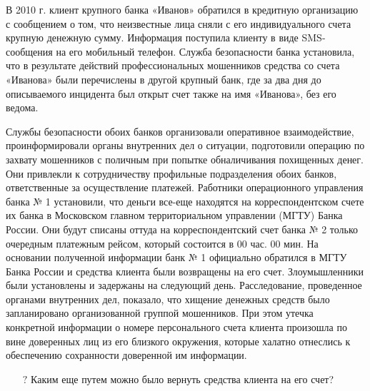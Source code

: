 \documentclass[a4paper,12pt,fleqn]{article} %
\begin{document}
\begin{tcolorbox}[colback=yellow!55!red!5!,colframe=yellow!55!red,enforce breakable,%
	pad at break=1mm, title=Кейс 1. Знание механизма работы платежной системы]
	
	В 2010 г. клиент крупного банка «Иванов» обратился в кредитную организацию с сообщением о том, что неизвестные лица сняли с его индивидуального счета крупную денежную сумму. Информация поступила клиенту в виде SMS-сообщения на его мобильный телефон. Служба безопасности банка установила, что в результате действий профессиональных мошенников средства со счета «Иванова» были перечислены в другой крупный банк, где за два дня до описываемого инцидента был открыт счет также на имя «Иванова», без его ведома.
	
	Службы безопасности обоих банков организовали оперативное взаимодействие, проинформировали органы внутренних дел о ситуации, подготовили операцию по захвату мошенников с поличным при попытке обналичивания похищенных денег. Они привлекли к сотрудничеству профильные подразделения обоих банков, ответственные за осуществление платежей. Работники операционного управления банка № 1 установили, что деньги все-еще находятся на корреспондентском счете их банка в Московском главном территориальном управлении (МГТУ) Банка России. Они будут списаны оттуда на корреспондентский счет банка № 2 только очередным платежным рейсом, который состоится в 00 час. 00 мин. На основании полученной информации банк № 1 официально обратился в МГТУ Банка России и средства клиента были возвращены на его счет. Злоумышленники были установлены и задержаны на следующий день. Расследование, проведенное органами внутренних дел, показало, что хищение денежных средств было запланировано организованной группой мошенников. При этом утечка конкретной информации о номере персонального счета клиента произошла по вине доверенных лиц из его близкого окружения, которые халатно отнеслись к обеспечению сохранности доверенной им информации.

	\begin{itemize}
		\item[{\color{yellow!55!red}\Huge {  $ ? $}} \quad]   Каким еще путем можно было 	вернуть средства  клиента на его счет?
	\end{itemize}	
	
	 \end{tcolorbox}



	\renewcommand{\theenumi}{\arabic{enumi}}
	\renewcommand{\labelenumi}{(\theenumi)}
\end{document}
